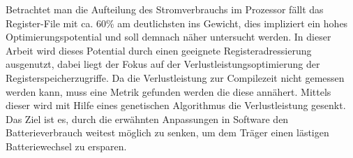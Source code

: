 Betrachtet man die Aufteilung des Stromverbrauchs im Prozessor fällt das Register-File mit ca. 60\% am deutlichsten ins Gewicht, dies impliziert ein hohes Optimierungspotential und soll demnach näher untersucht werden. In dieser Arbeit wird dieses Potential durch einen geeignete Registeradressierung ausgenutzt, dabei liegt der Fokus auf der Verlustleistungsoptimierung der Registerspeicherzugriffe. Da die Verlustleistung zur Compilezeit nicht gemessen werden kann, muss eine Metrik gefunden werden die diese annähert. Mittels dieser wird mit Hilfe eines genetischen Algorithmus die Verlustleistung gesenkt. Das Ziel ist es, durch die erwähnten Anpassungen in Software den Batterieverbrauch weitest möglich zu senken, um dem Träger einen lästigen Batteriewechsel zu ersparen.






